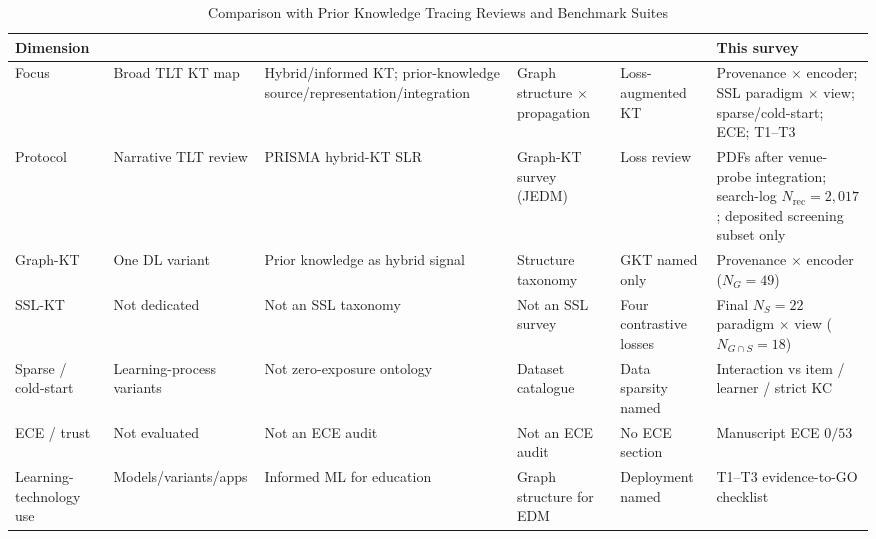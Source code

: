 \documentclass[lettersize,journal]{IEEEtran}
\begin{document}
\begin{table}[t]
\caption{Comparison with Prior Knowledge Tracing Reviews and Benchmark Suites}
\label{tab:survey_comparison}
\centering
\footnotesize
\setlength{\tabcolsep}{3.4pt}
\begin{tabular}{@{}>{\raggedright\arraybackslash}p{2.0cm}
>{\raggedright\arraybackslash}p{2.3cm}
>{\raggedright\arraybackslash}p{2.4cm}
>{\raggedright\arraybackslash}p{2.3cm}
>{\raggedright\arraybackslash}p{2.3cm}
>{\raggedright\arraybackslash}p{2.7cm}@{}}
\toprule
\textbf{Dimension} & \cite{Shen_KTSurvey_2024} & \cite{Zanellati_HybridKT_2024} & \cite{Xu_GbKT_2026} & \cite{Shukurlu_LossKT_2025} & \textbf{This survey} \\
\midrule
Focus & Broad TLT KT map & Hybrid/informed KT; prior-knowledge source/representation/integration & Graph structure $\times$ propagation & Loss-augmented KT & Provenance $\times$ encoder; SSL paradigm $\times$ view; sparse/cold-start; ECE; T1--T3 \\
Protocol & Narrative TLT review & PRISMA hybrid-KT SLR & Graph-KT survey (JEDM) & Loss review & 53 PDFs after venue-probe integration; search-log $N_{\mathrm{rec}}=2{,}017$; deposited screening subset only \\
Graph-KT & One DL variant & Prior knowledge as hybrid signal & Structure taxonomy & GKT named only & Provenance $\times$ encoder ($N_G=49$) \\
SSL-KT & Not dedicated & Not an SSL taxonomy & Not an SSL survey & Four contrastive losses & Final $N_S=22$ paradigm $\times$ view ($N_{G\cap S}=18$) \\
Sparse / cold-start & Learning-process variants & Not zero-exposure ontology & Dataset catalogue & Data sparsity named & Interaction vs item / learner / strict KC \\
ECE / trust & Not evaluated & Not an ECE audit & Not an ECE audit & No ECE section & Manuscript ECE $0/53$ \\
Learning-technology use & Models/variants/apps & Informed ML for education & Graph structure for EDM & Deployment named & T1--T3 evidence-to-GO checklist \\
\bottomrule
\end{tabular}
\end{table}
\end{document}

